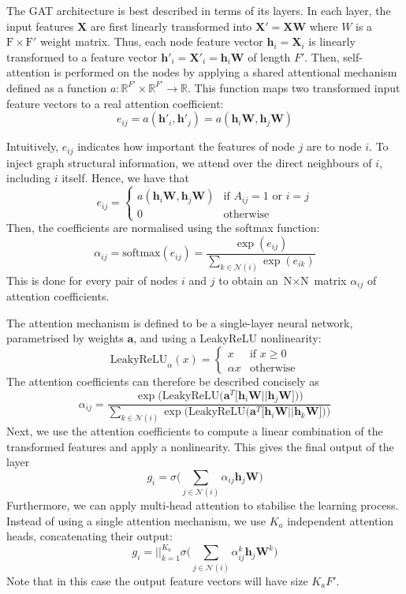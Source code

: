 \documentclass[12pt]{article}
\theoremstyle{definition}
\begin{document}
\bigskip

The GAT architecture is best described in terms of its layers. In each layer, the input features $\textbf{X}$ are first linearly transformed into $\textbf{X}' = \textbf{X}\textbf{W}$ where $W$ is a $\textrm{F} \times \textrm{F}'$ weight matrix. Thus, each node feature vector $\mathbf{h}_i = \mathbf{X}_i$ is linearly transformed to a feature vector $\mathbf{h}'_i = \mathbf{X}'_i = \mathbf{h}_i \textbf{W}$ of length $F'$. Then, self-attention is performed on the nodes by applying a shared attentional mechanism defined as a function $a: \mathbb{R}^{F'} \times \mathbb{R}^{F'} \to \mathbb{R}$. This function maps two transformed input feature vectors to a real attention coefficient:
\[
e_{ij} = a(\mathbf{h}'_i, \mathbf{h}'_j) = a(\mathbf{h}_i \textbf{W}, \mathbf{h}_j \textbf{W})
\]

Intuitively, $e_{ij}$ indicates how important the features of node $j$ are to node $i$. To inject graph structural information, we attend over the direct neighbours of $i$, including $i$ itself. Hence, we have that
\begin{equation*}
e_{ij} = \begin{cases}
				a(\mathbf{h}_i \textbf{W}, \mathbf{h}_j \textbf{W}) &\text{if $A_{ij} = 1$ or $i = j$}\\
				0 &\text{otherwise}
			\end{cases}
\end{equation*}
Then, the coefficients are normalised using the softmax function:
\[
\alpha_{ij} = \textrm{softmax}(e_{ij}) = \frac{\exp(e_{ij})}{\sum_{k \in \mathcal{N}(i)} \exp(e_{ik})}
\]
This is done for every pair of nodes $i$ and $j$ to obtain an $\textrm{N} \times \textrm{N}$ matrix $\alpha_{ij}$ of attention coefficients.

\bigskip

The attention mechanism is defined to be a single-layer neural network, parametrised by weights $\textbf{a}$, and using a LeakyReLU nonlinearity: 
\[
\textrm{LeakyReLU}_{\alpha}(x) = 
	\begin{cases}
		x &\text{if $x \ge 0$}\\
		\alpha x &\text{otherwise}
	\end{cases}
\]
The attention coefficients can therefore be described concisely as
\[
\alpha_{ij} = \frac{\exp \big( \textrm{LeakyReLU}\big( \textbf{a}^T \big[ \mathbf{h}_i \textbf{W} \vert\vert \mathbf{h}_j \textbf{W} \big] \big) \big)}
{
\sum_{k \in \mathcal{N}(i)} \exp \big( \textrm{LeakyReLU}\big( \textbf{a}^T \big[ \mathbf{h}_i \textbf{W} \vert\vert \mathbf{h}_k \textbf{W} \big] \big) \big)
}
\]
Next, we use the attention coefficients to compute a linear combination of the transformed features and apply a nonlinearity. This gives the final output of the layer
\[
g_i = \sigma \big( \sum_{j \in \mathcal{N}(i)} \alpha_{ij} \mathbf{h}_j \textbf{W} \big)
\]
Furthermore, we can apply multi-head attention to stabilise the learning process. Instead of using a single attention mechanism, we use $K_a$ independent attention heads, concatenating their output:
\[
g_i = {\Big\vert\Big\vert}_{k=1}^{K_a} \sigma \big( \sum_{j \in \mathcal{N}(i)} \alpha_{ij}^k \mathbf{h}_j \textbf{W}^k \big)
\]
Note that in this case the output feature vectors will have size $K_a F'$.
\end{document}
